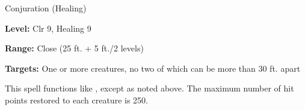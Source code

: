 \label{spell:Mass Heal}

Conjuration (Healing)

\textbf{Level:} Clr 9, Healing 9

\textbf{Range:} Close (25 ft. + 5 ft./2 levels)

\textbf{Targets:} One or more creatures, no two of which can be more than 30 ft. 
apart

This spell functions like , except as noted above. The maximum number 
of hit points restored to each creature is 250.

